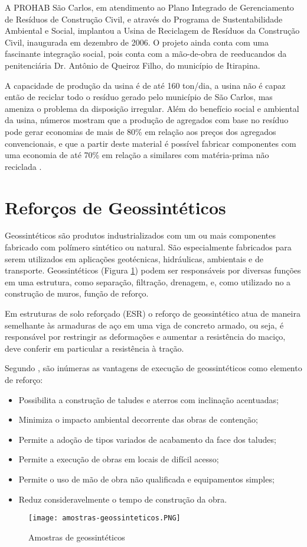 A PROHAB São Carlos, em atendimento ao Plano Integrado de Gerenciamento de Resíduos de Construção Civil, e através do Programa de Sustentabilidade Ambiental e Social, implantou a Usina de Reciclagem de Resíduos da Construção Civil, inaugurada em dezembro de 2006. O projeto ainda conta com uma fascinante integração social, pois conta com a mão-de-obra de reeducandos da penitenciária Dr. Antônio de Queiroz Filho, do município de Itirapina.

A capacidade de produção da usina é de até 160 ton/dia, a usina não é capaz então de reciclar todo o resíduo gerado pelo município de São Carlos, mas ameniza o problema da disposição irregular. Além do benefício social e ambiental da usina, números mostram  que a produção de agregados com base no resíduo pode gerar economias de mais de 80\% em relação aos preços dos agregados convencionais, e que a partir deste material é possível fabricar componentes com uma economia de até 70\% em relação a similares com matéria-prima não reciclada \cite{prohab:site}.


\section{Reforços de Geossintéticos}

Geossintéticos são produtos industrializados com um ou mais componentes fabricado com polímero sintético ou natural. São especialmente fabricados para serem utilizados em aplicações geotécnicas, hidráulicas, ambientais e de transporte. Geossintéticos (Figura \ref{fig:amostras-geossinteticos}) podem ser responsáveis por diversas funções em uma estrutura, como separação, filtração, drenagem, e, como utilizado no a construção de muros, função de reforço. 

Em estruturas de solo reforçado (ESR) o reforço de geossintético atua de maneira semelhante às armaduras de aço em uma viga de concreto armado, ou seja, é responsável por restringir as deformações e aumentar a resistência do maciço, deve conferir em particular a resistência à tração.

Segundo \cite{manual-geossinteticos}, são inúmeras as vantagens de execução de geossintéticos como elemento de reforço:

\begin{itemize}
    \item Possibilita a construção de taludes e aterros com inclinação acentuadas;
    \item Minimiza o impacto ambiental decorrente das obras de contenção;
    \item Permite a adoção de tipos variados de acabamento da face dos taludes;
    \item Permite a execução de obras em locais de difícil acesso;
    \item Permite o uso de mão de obra não qualificada e equipamentos simples;
    \item Reduz consideravelmente o tempo de construção da obra.
\end{itemize}

\begin{figure}[htb]
 \caption{Amostras de geossintéticos}
 \label{fig:amostras-geossinteticos}
 \centering
 \texttt{[image: amostras-geossinteticos.PNG]}
\end{figure}


